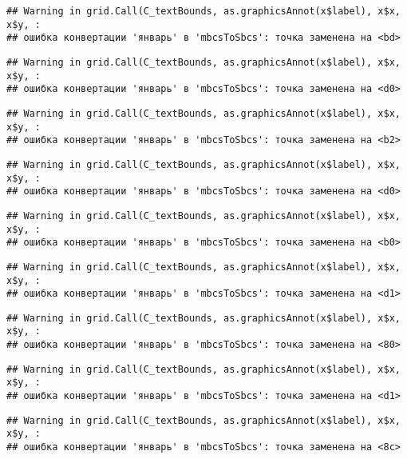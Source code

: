 \documentclass[
]{article}
\begin{document}
\begin{verbatim}
## Warning in grid.Call(C_textBounds, as.graphicsAnnot(x$label), x$x, x$y, :
## ошибка конвертации 'январь' в 'mbcsToSbcs': точка заменена на <bd>
\end{verbatim}

\begin{verbatim}
## Warning in grid.Call(C_textBounds, as.graphicsAnnot(x$label), x$x, x$y, :
## ошибка конвертации 'январь' в 'mbcsToSbcs': точка заменена на <d0>
\end{verbatim}

\begin{verbatim}
## Warning in grid.Call(C_textBounds, as.graphicsAnnot(x$label), x$x, x$y, :
## ошибка конвертации 'январь' в 'mbcsToSbcs': точка заменена на <b2>
\end{verbatim}

\begin{verbatim}
## Warning in grid.Call(C_textBounds, as.graphicsAnnot(x$label), x$x, x$y, :
## ошибка конвертации 'январь' в 'mbcsToSbcs': точка заменена на <d0>
\end{verbatim}

\begin{verbatim}
## Warning in grid.Call(C_textBounds, as.graphicsAnnot(x$label), x$x, x$y, :
## ошибка конвертации 'январь' в 'mbcsToSbcs': точка заменена на <b0>
\end{verbatim}

\begin{verbatim}
## Warning in grid.Call(C_textBounds, as.graphicsAnnot(x$label), x$x, x$y, :
## ошибка конвертации 'январь' в 'mbcsToSbcs': точка заменена на <d1>
\end{verbatim}

\begin{verbatim}
## Warning in grid.Call(C_textBounds, as.graphicsAnnot(x$label), x$x, x$y, :
## ошибка конвертации 'январь' в 'mbcsToSbcs': точка заменена на <80>
\end{verbatim}

\begin{verbatim}
## Warning in grid.Call(C_textBounds, as.graphicsAnnot(x$label), x$x, x$y, :
## ошибка конвертации 'январь' в 'mbcsToSbcs': точка заменена на <d1>
\end{verbatim}

\begin{verbatim}
## Warning in grid.Call(C_textBounds, as.graphicsAnnot(x$label), x$x, x$y, :
## ошибка конвертации 'январь' в 'mbcsToSbcs': точка заменена на <8c>
\end{verbatim}
\end{document}
